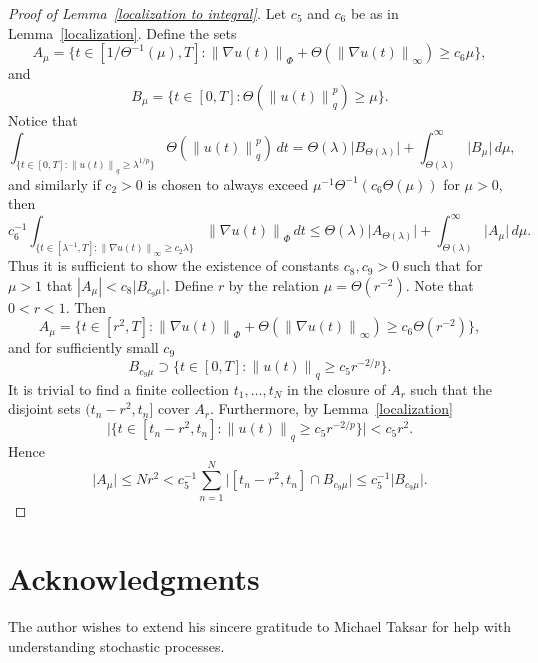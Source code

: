 \documentclass[12pt]{amsart}
\theoremstyle{remark}
\newcommand{\modo}[1]{{\left|#1\right|}}
\newcommand{\smodo}[1]{{\mathopen|#1\mathclose|}}
\newcommand{\snormo}[1]{{\mathopen\|#1\mathclose\|}}
\begin{document}
\begin{proof}[Proof of Lemma~\ref{localization to integral}]
Let $c_5$ and $c_6$ be as in Lemma~\ref{localization}.
Define the sets
$$ A_\mu = \{t \in [1/\Theta^{-1}(\mu),T]:
   \snormo{\nabla u(t)}_\Phi + 
   \Theta(\snormo{\nabla u(t)}_\infty) \ge 
   c_6 \mu \} ,$$
and
$$ B_\mu 
   =
   \{t \in [0,T]:
   \Theta(\snormo{u(t)}_q^p) \ge \mu\} .$$
Notice that
$$
   \int_{\{t \in [0,T] \colon
         \snormo{u(t)}_q \ge \lambda^{1/p}\}}
   \Theta(\snormo{u(t)}_q^p) \, dt
   =
   \Theta(\lambda) \smodo{B_{\Theta(\lambda)}}
   +
   \int_{\Theta(\lambda)}^\infty \smodo{B_\mu} \, d\mu ,
$$
and similarly if $c_2>0$ is chosen to always exceed 
$\mu^{-1} \Theta^{-1}(c_6 \Theta(\mu))$ for $\mu > 0$, then
$$
   c_6^{-1} \int_{\{t \in [\lambda^{-1},T] \colon
         \snormo{\nabla u(t)}_\infty \ge c_2 \lambda\}}
   \snormo{\nabla u(t)}_{\Phi} \, dt
   \le 
   \Theta(\lambda) \smodo{A_{\Theta(\lambda)}}
   + 
   \int_{\Theta(\lambda)}^\infty \smodo{A_\mu} \, d\mu .
$$
Thus it is sufficient to show the existence of constants $c_8,c_9>0$ such
that for $\mu > 1$ that $\modo{A_\mu} < c_8 \smodo{B_{c_9\mu}}$.
Define $r$ by the relation $\mu = \Theta(r^{-2})$.  Note that
$0 < r < 1$.  Then
$$ A_\mu = \{t \in [r^2,T]:
   \snormo{\nabla u(t)}_\Phi + 
   \Theta(\snormo{\nabla u(t)}_\infty) \ge 
   c_6 \Theta(r^{-2}) \} ,$$
and for sufficiently small $c_9$
$$ B_{c_9\mu} \supset \{t \in [0,T]:\snormo{u(t)}_q \ge c_5 r^{-2/p}\} .$$
It is trivial to find a finite collection $t_1,\dots,t_N$
in the closure of $A_r$
such that the disjoint sets $(t_n-r^2,t_n]$ cover $A_r$.
Furthermore, by Lemma~\ref{localization}
$$ \smodo{\{t \in [t_n-r^2,t_n] : \snormo{u(t)}_q \ge c_5 r^{-2/p}\}} 
   < c_5 r^2 .$$
Hence
$$ \smodo{A_\mu}
   \le
   N r^2
   <
   c_5^{-1} \sum_{n=1}^N \smodo{[t_n-r^2,t_n] \cap B_{c_9\mu}}
   \le
   c_5^{-1} \smodo{B_{c_9\mu}} .
$$
\end{proof}


\section*{Acknowledgments}

The author wishes to extend his sincere gratitude to Michael Taksar for
help with understanding stochastic processes.
\end{document}
